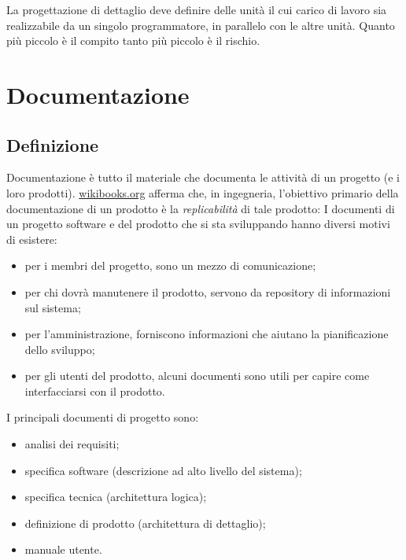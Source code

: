 \documentclass[a4paper]{article}
\begin{document}
		
La progettazione di dettaglio deve definire delle unità il cui carico di lavoro sia realizzabile da un singolo programmatore, in parallelo con le altre unità. Quanto più piccolo è il compito tanto più piccolo è il rischio.
	


		
	\section{Documentazione}


		
	\subsection{Definizione}

		
Documentazione è tutto il materiale che documenta le attività di un progetto (e i loro prodotti). \href{https://en.wikibooks.org/wiki/General_Engineering_Introduction/Documentation}{wikibooks.org} afferma che, in ingegneria, l'obiettivo primario della documentazione di un prodotto è la \emph{replicabilità} di tale prodotto:  I documenti di un progetto software e del prodotto che si sta sviluppando hanno diversi motivi di esistere:
		
	\begin{itemize}
		
			
	\item per i membri del progetto, sono un mezzo di comunicazione;
			
	\item per chi dovrà manutenere il prodotto, servono da repository di informazioni sul sistema;
			
	\item per l'amministrazione, forniscono informazioni che aiutano la pianificazione dello sviluppo;
			
	\item per gli utenti del prodotto, alcuni documenti sono utili per capire come interfacciarsi con il prodotto.
		
	\end{itemize}

		
I principali documenti di progetto sono:
		
	\begin{itemize}
		
			
	\item analisi dei requisiti;
			
	\item specifica software (descrizione ad alto livello del sistema);
			
	\item specifica tecnica (architettura logica);
			
	\item definizione di prodotto (architettura di dettaglio);
			
	\item manuale utente.
		
	\end{itemize}
\end{document}
